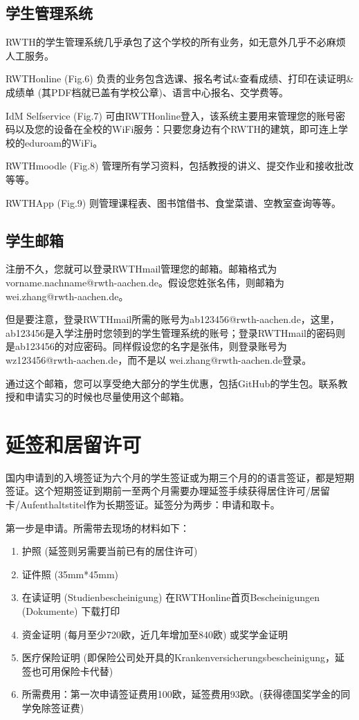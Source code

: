  \subsection{学生管理系统}

    RWTH的学生管理系统几乎承包了这个学校的所有业务，如无意外几乎不必麻烦人工服务。

    RWTHonline (Fig.6) 负责的业务包含选课、报名考试\&查看成绩、打印在读证明\&成绩单 (其PDF档就已盖有学校公章)、语言中心报名、交学费等。

    IdM Selfservice (Fig.7) 可由RWTHonline登入，该系统主要用来管理您的账号密码以及您的设备在全校的WiFi服务：只要您身边有个RWTH的建筑，即可连上学校的eduroam的WiFi。

    RWTHmoodle (Fig.8) 管理所有学习资料，包括教授的讲义、提交作业和接收批改等等。

    RWTHApp (Fig.9) 则管理课程表、图书馆借书、食堂菜谱、空教室查询等等。

  \subsection{学生邮箱}

    注册不久，您就可以登录RWTHmail管理您的邮箱。邮箱格式为 vorname.nachname@rwth-aachen.de。假设您姓张名伟，则邮箱为 wei.zhang@rwth-aachen.de。

    但是要注意，登录RWTHmail所需的账号为ab123456@rwth-aachen.de，这里，ab123456是入学注册时您领到的学生管理系统的账号；登录RWTHmail的密码则是ab123456的对应密码。同样假设您的名字是张伟，则登录账号为 wz123456@rwth-aachen.de，而不是以 wei.zhang@rwth-aachen.de登录。

    通过这个邮箱，您可以享受绝大部分的学生优惠，包括GitHub的学生包。联系教授和申请实习的时候也尽量使用这个邮箱。

\section{延签和居留许可}

  国内申请到的入境签证为六个月的学生签证或为期三个月的的语言签证，都是短期签证。这个短期签证到期前一至两个月需要办理延签手续获得居住许可/居留卡/Aufenthaltstitel作为长期签证。延签分为两步：申请和取卡。

  第一步是申请。所需带去现场的材料如下：
  \begin{enumerate}
    \item 护照 (延签则另需要当前已有的居住许可)
    \item 证件照 (35mm*45mm)
    \item 在读证明 (Studienbescheinigung) 在RWTHonline首页Bescheinigungen (Dokumente) 下载打印
    \item 资金证明 (每月至少720欧，近几年增加至840欧) 或奖学金证明
    \item 医疗保险证明 (即保险公司处开具的Krankenversicherungsbescheinigung，延签也可用保险卡代替)
    \item 所需费用：第一次申请签证费用100欧，延签费用93欧。(获得德国奖学金的同学免除签证费)
  \end{enumerate}

